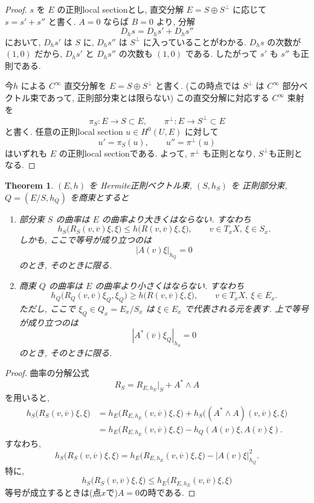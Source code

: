 \documentclass[dvipdfmx,a4paper,11pt]{article} %
\newtheorem{thm}{Theorem}[section]
\theoremstyle{definition}
\theoremstyle{remark}
\numberwithin{equation}{section}
\begin{document}
\begin{proof}
\(s\) を \(E\) の正則local sectionとし, 直交分解 \(E=S\oplus S^\perp\) に応じて \(s=s'+s''\) と書く. \(A=0\) ならば \(B=0\) より, 分解
\[
D_hs=D_hs'+D_hs''
\]
において, \(D_hs'\) は \(S\) に, \(D_hs''\) は \(S^\perp\) に入っていることがわかる. \(D_hs\) の次数が \((1,0)\) だから, \(D_hs'\) と \(D_hs''\) の次数も \((1,0)\) である. したがって \(s'\) も \(s''\) も正則である.

今\(h\) による \(C^\infty\) 直交分解を
\(
E=S\oplus S^\perp
\)
と書く. (この時点では \(S^\perp\) は
\(C^\infty\) 部分ベクトル束であって, 正則部分束とは限らない)
この直交分解に対応する \(C^\infty\) 束射を
\[
\pi_S:E\longrightarrow S\subset E,
\qquad
\pi^\perp:E\longrightarrow S^\perp\subset E
\]
と書く. 任意の正則local section \(u\in H^0(U,E)\) に対して
\[
u'=\pi_S(u),
\qquad
u''=\pi^\perp(u)
\]
はいずれも \(E\) の正則local sectionである. よって, 
\(\pi^\perp\) も正則となり, $S^{\perp}$も正則となる. 
\end{proof}



\begin{thm}
\label{thm-exact-curv}
\((E,h)\) を Hermite正則ベクトル束, \((S,h_S)\) を 正則部分束, \(Q=(E/S,h_Q)\) を商束とすると
\begin{enumerate}
\item[(i)]
部分束 \(S\) の曲率は \(E\) の曲率より大きくはならない. すなわち
\[
h_S\bigl(R_S(v,\overline v)\xi,\xi\bigr)
\leq
h\bigl(R(v,\overline v)\xi,\xi\bigr),
\qquad
v\in T_xX,\ \xi\in S_x.
\]
しかも, ここで等号が成り立つのは
\[
|A(v)\xi|_{h_Q}=0
\]
のとき, そのときに限る. %

\item[(ii)]
商束 \(Q\) の曲率は \(E\) の曲率より小さくはならない. すなわち
\[
h_Q\bigl(R_Q(v,\overline v)\xi_Q,\xi_Q\bigr)
\geq
h\bigl(R(v,\overline v)\xi,\xi\bigr),
\qquad
v\in T_xX,\ \xi\in E_x.
\]
ただし, ここで \(\xi_Q\in Q_x=E_x/S_x\) は \(\xi\in E_x\) で代表される元を表す. 上で等号が成り立つのは
\[
|A^*(\overline v)\xi_Q|_{h_S}=0
\]
のとき, そのときに限る. 
\end{enumerate}
\end{thm}
\begin{proof}
曲率の分解公式
\[
R_S
=
R_{E,h_E}|_S
+
A^*\wedge A
\]
を用いると,
\[
\begin{aligned}
h_S\bigl(R_S(v,\overline v)\xi,\xi\bigr)
&=
h_E\bigl(R_{E,h_E}(v,\overline v)\xi,\xi\bigr)
+
h_S\bigl((A^*\wedge A)(v,\overline v)\xi,\xi\bigr) \\
&=
h_E\bigl(R_{E,h_E}(v,\overline v)\xi,\xi\bigr)
-
h_Q(A(v)\xi,A(v)\xi).
\end{aligned}
\]
すなわち,
\[
h_S\bigl(R_S(v,\overline v)\xi,\xi\bigr)
=
h_E\bigl(R_{E,h_E}(v,\overline v)\xi,\xi\bigr)
-
\left|A(v)\xi\right|_{h_Q}^{2}.
\]
特に,
\[
h_S\bigl(R_S(v,\overline v)\xi,\xi\bigr)
\leq
h_E\bigl(R_{E,h_E}(v,\overline v)\xi,\xi\bigr)
\]
等号が成立するときは(点$x$で)$A = 0$の時である. 
\end{proof}
\end{document}
